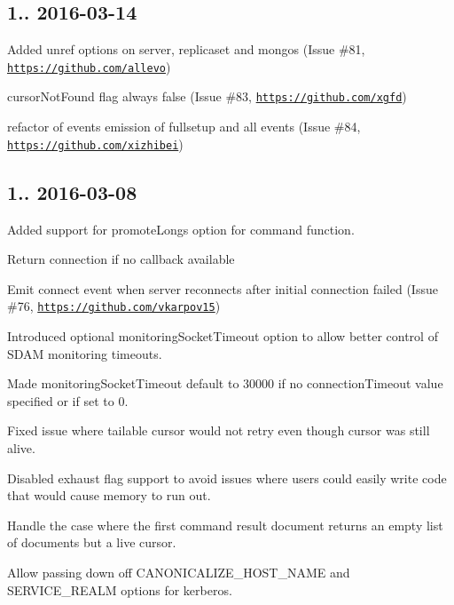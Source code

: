 \subsection*{1.. 2016-\/03-\/14 }


\begin{DoxyItemize}
\item Added unref options on server, replicaset and mongos (Issue \#81, \href{https://github.com/allevo}{\tt https\+://github.\+com/allevo})
\item cursor\+Not\+Found flag always false (Issue \#83, \href{https://github.com/xgfd}{\tt https\+://github.\+com/xgfd})
\item refactor of events emission of fullsetup and all events (Issue \#84, \href{https://github.com/xizhibei}{\tt https\+://github.\+com/xizhibei})
\end{DoxyItemize}

\subsection*{1.. 2016-\/03-\/08 }


\begin{DoxyItemize}
\item Added support for promote\+Longs option for command function.
\item Return connection if no callback available
\item Emit connect event when server reconnects after initial connection failed (Issue \#76, \href{https://github.com/vkarpov15}{\tt https\+://github.\+com/vkarpov15})
\item Introduced optional monitoring\+Socket\+Timeout option to allow better control of S\+D\+AM monitoring timeouts.
\item Made monitoring\+Socket\+Timeout default to 30000 if no connection\+Timeout value specified or if set to 0.
\item Fixed issue where tailable cursor would not retry even though cursor was still alive.
\item Disabled exhaust flag support to avoid issues where users could easily write code that would cause memory to run out.
\item Handle the case where the first command result document returns an empty list of documents but a live cursor.
\item Allow passing down off C\+A\+N\+O\+N\+I\+C\+A\+L\+I\+Z\+E\+\_\+\+H\+O\+S\+T\+\_\+\+N\+A\+ME and S\+E\+R\+V\+I\+C\+E\+\_\+\+R\+E\+A\+LM options for kerberos.
\end{DoxyItemize}

